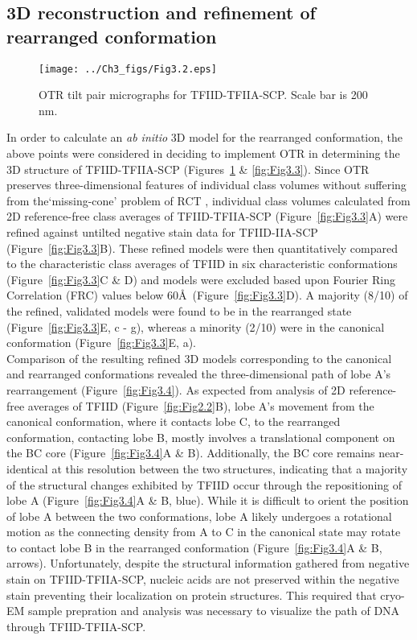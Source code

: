 \subsection{3D reconstruction and refinement of rearranged conformation}
\begin{figure}
\centering
\texttt{[image: ../Ch3\_figs/Fig3.2.eps]}
\caption[OTR tilt pair micrographs for TFIID-TFIIA-SCP]{OTR tilt pair micrographs for TFIID-TFIIA-SCP. Scale bar is 200 nm.}
\label{fig:Fig3.2}
\end{figure}
In order to calculate an \emph{ab initio} 3D model for the rearranged conformation, the above points were considered in deciding to implement OTR in determining the 3D structure of TFIID-TFIIA-SCP (Figures~\ref{fig:Fig3.2} \& \ref{fig:Fig3.3}). Since OTR preserves three-dimensional features of individual class volumes without suffering from the‘missing-cone' problem of RCT \cite{Chandramouli_280}, individual class volumes calculated from 2D reference-free class averages of TFIID-TFIIA-SCP (Figure~\ref{fig:Fig3.3}A) were refined against untilted negative stain data for TFIID-IIA-SCP (Figure~\ref{fig:Fig3.3}B).  These refined models were then quantitatively compared to the characteristic class averages of TFIID in six characteristic conformations (Figure~\ref{fig:Fig3.3}C \& D) and models were excluded based upon Fourier Ring Correlation (FRC) \cite{Saxton_3960} values below 60\AA\ (Figure~\ref{fig:Fig3.3}D).  A majority (8/10) of the refined, validated models were found to be in the rearranged state (Figure~\ref{fig:Fig3.3}E, c - g), whereas a minority (2/10) were in the canonical conformation (Figure~\ref{fig:Fig3.3}E, a).  \\
\indent Comparison of the resulting refined 3D models corresponding to the canonical and rearranged conformations revealed the three-dimensional path of lobe A's rearrangement (Figure~\ref{fig:Fig3.4}). As expected from analysis of 2D reference-free averages of TFIID (Figure~\ref{fig:Fig2.2}B), lobe A's movement from the canonical conformation, where it contacts lobe C, to the rearranged conformation, contacting lobe B, mostly involves a translational component on the BC core (Figure~\ref{fig:Fig3.4}A \& B). Additionally, the BC core remains near-identical at this resolution between the two structures, indicating that a majority of the structural changes exhibited by TFIID occur through the repositioning of lobe A (Figure~\ref{fig:Fig3.4}A \& B, blue). While it is difficult to orient the position of lobe A between the two conformations, lobe A likely undergoes a rotational motion as the connecting density from A to C in the canonical state may rotate to contact lobe B in the rearranged conformation (Figure~\ref{fig:Fig3.4}A \& B, arrows). Unfortunately, despite the structural information gathered from negative stain on  TFIID-TFIIA-SCP, nucleic acids are not preserved within the negative stain preventing their localization on protein structures. This required that cryo-EM sample prepration and analysis was necessary to visualize the path of DNA through TFIID-TFIIA-SCP.\\ 
